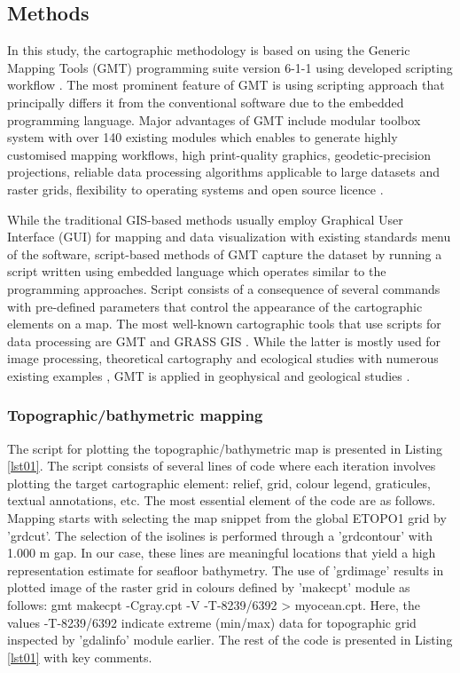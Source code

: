 \documentclass[geomatics,article,submit,pdftex,moreauthors]{Definitions/mdpi}
\begin{document}
\subsection{Methods}

 In this study, the cartographic methodology is based on using the Generic Mapping Tools (GMT) programming suite version 6-1-1 \cite{Wessel} using developed scripting workflow \cite{Lemenkova202212,Lemenkova202203}. The most prominent feature of GMT is using scripting approach that principally differs it from the conventional software due to the embedded programming language. Major advantages of GMT include modular toolbox system with over 140 existing modules which enables to generate highly customised mapping workflows, high print-quality graphics, geodetic-precision projections, reliable data processing algorithms applicable to large datasets and raster grids, flexibility to operating systems and open source licence \cite{WesselLuis}. 

While the traditional GIS-based methods usually employ Graphical User Interface (GUI) for mapping and data visualization with existing standards menu of the software, script-based methods of GMT capture the dataset by running a script written using embedded language which operates similar to the programming approaches. Script consists of a consequence of several commands with pre-defined parameters that control the appearance of the cartographic elements on a map. The most well-known cartographic tools that use scripts for data processing are GMT \cite{Lemenkova202217} and GRASS GIS \cite{NETELER2012124}. While the latter is mostly used for image processing, theoretical cartography and ecological studies with numerous existing examples  \cite{ROCCHINI2017166,FRIGERI20111265,Lemenkova202313,SOROKINE2007685}, GMT is applied in geophysical and geological studies \cite{Lee,Lemenkova202206,DeSanto}.

\subsubsection{Topographic/bathymetric mapping}

The script for plotting the topographic/bathymetric map is presented in Listing \ref{lst01}. The script consists of several lines of code where each iteration involves plotting the target cartographic element: relief, grid, colour legend, graticules, textual annotations, etc. The most essential element of the code are as follows. Mapping starts with selecting the map snippet from the global ETOPO1 grid by 'grdcut'. The selection of the isolines is performed through a 'grdcontour' with 1.000 m gap. In our case, these lines are meaningful locations that yield a high representation estimate for seafloor bathymetry. The use of 'grdimage' results in plotted image of the raster grid in colours defined by 'makecpt' module as follows: gmt makecpt -Cgray.cpt -V -T-8239/6392 > myocean.cpt. Here, the values -T-8239/6392 indicate extreme (min/max) data for topographic grid inspected by 'gdalinfo' module earlier. The rest of the code is presented in Listing \ref{lst01} with key comments.
\end{document}
